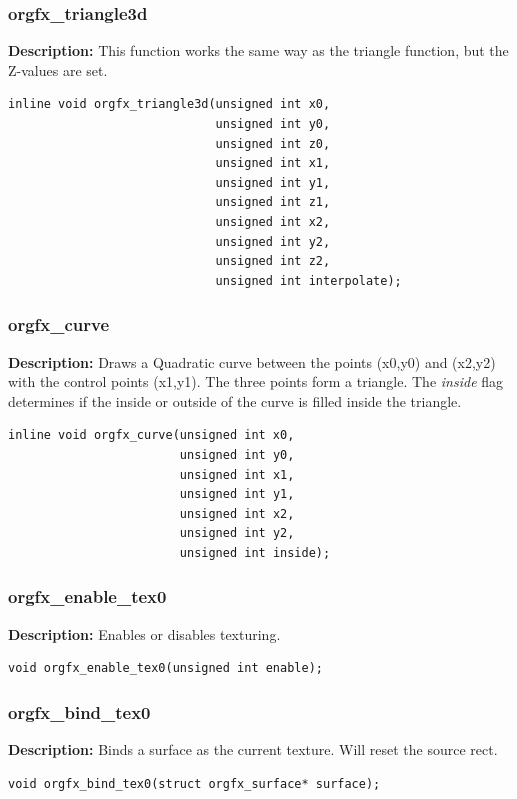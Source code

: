 \documentclass[10pt,a4paper]{article}
\begin{document}
\subsubsection{orgfx\_triangle3d}
\textbf{Description:} This function works the same way as the triangle function, but the Z-values are set.
\begin{lstlisting}
inline void orgfx_triangle3d(unsigned int x0, 
                             unsigned int y0, 
                             unsigned int z0, 
                             unsigned int x1, 
                             unsigned int y1, 
                             unsigned int z1, 
                             unsigned int x2, 
                             unsigned int y2,
                             unsigned int z2, 
                             unsigned int interpolate);
\end{lstlisting}

\subsubsection{orgfx\_curve}
\textbf{Description:} Draws a Quadratic curve between the points (x0,y0) and (x2,y2) with the control points (x1,y1). The three points form a triangle. The \textit{inside} flag determines if the inside or outside of the curve is filled inside the triangle.
\begin{lstlisting}
inline void orgfx_curve(unsigned int x0, 
                        unsigned int y0, 
                        unsigned int x1, 
                        unsigned int y1, 
                        unsigned int x2, 
                        unsigned int y2, 
                        unsigned int inside);
\end{lstlisting}

\subsubsection{orgfx\_enable\_tex0}
\textbf{Description:} Enables or disables texturing.
\begin{lstlisting}
void orgfx_enable_tex0(unsigned int enable);
\end{lstlisting}

\subsubsection{orgfx\_bind\_tex0}
\textbf{Description:} Binds a surface as the current texture. Will reset the source rect.
\begin{lstlisting}
void orgfx_bind_tex0(struct orgfx_surface* surface);
\end{lstlisting}
\end{document}
